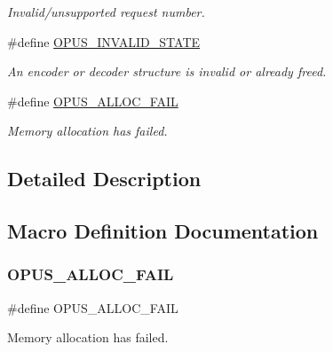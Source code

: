 \begin{DoxyCompactItemize}
\begin{DoxyCompactList}\small\item\em Invalid/unsupported request number. \end{DoxyCompactList}\item 
\#define \hyperlink{group__opus__errorcodes_ga54416ec79619179d688918f25e9b20e3}{O\+P\+U\+S\+\_\+\+I\+N\+V\+A\+L\+I\+D\+\_\+\+S\+T\+A\+TE}
\begin{DoxyCompactList}\small\item\em An encoder or decoder structure is invalid or already freed. \end{DoxyCompactList}\item 
\#define \hyperlink{group__opus__errorcodes_ga92fae6b1de2ac16b8d96561f9a8fb8b9}{O\+P\+U\+S\+\_\+\+A\+L\+L\+O\+C\+\_\+\+F\+A\+IL}
\begin{DoxyCompactList}\small\item\em Memory allocation has failed. \end{DoxyCompactList}\end{DoxyCompactItemize}


\subsection{Detailed Description}


\subsection{Macro Definition Documentation}
\mbox{\label{group__opus__errorcodes_ga92fae6b1de2ac16b8d96561f9a8fb8b9}} 
\subsubsection{\texorpdfstring{O\+P\+U\+S\+\_\+\+A\+L\+L\+O\+C\+\_\+\+F\+A\+IL}{OPUS\_ALLOC\_FAIL}}
{\footnotesize\ttfamily \#define O\+P\+U\+S\+\_\+\+A\+L\+L\+O\+C\+\_\+\+F\+A\+IL}



Memory allocation has failed. 

\mbox{\label{group__opus__errorcodes_gaf2d43e479455a1a3b6874e5faf4e827d}} 
